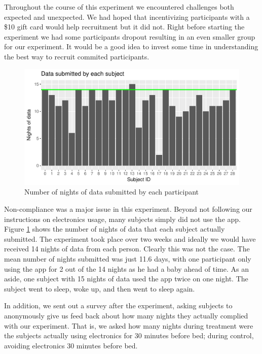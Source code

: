 \documentclass[12pt,]{article}
\begin{document}
Throughout the course of this experiment we encountered challenges both
expected and unexpected. We had hoped that incentivizing participants
with a \$10 gift card would help recruitment but it did not. Right
before starting the experiment we had some participants dropout
resulting in an even smaller group for our experiment. It would be a
good idea to invest some time in understanding the best way to recruit
commited participants.

\begin{figure}
\centering
\includegraphics{report_files/figure-latex/days_used-1.pdf}
\caption{\label{fig:days_used} Number of nights of data submitted by
each participant}
\end{figure}

Non-compliance was a major issue in this experiment. Beyond not
following our instructions on electronics usage, many subjects simply
did not use the app. Figure \ref{fig:days_used} shows the number of
nights of data that each subject actually submitted. The experiment took
place over two weeks and ideally we would have received 14 nights of
data from each person. Clearly this was not the case. The mean number of
nights submitted was just 11.6 days, with one participant only using the
app for 2 out of the 14 nights as he had a baby ahead of time. As an
aside, one subject with 15 nights of data used the app twice on one
night. The subject went to sleep, woke up, and then went to sleep again.

In addition, we sent out a survey after the experiment, asking subjects
to anonymously give us feed back about how many nights they actually
complied with our experiment. That is, we asked how many nights during
treatment were the subjects actually using electronics for 30 minutes
before bed; during control, avoiding electronics 30 minutes before bed.
\end{document}
